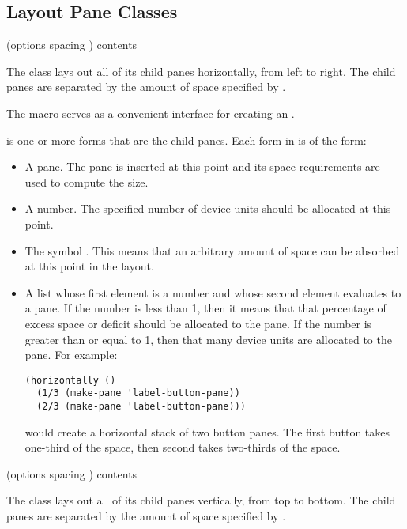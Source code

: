 \subsection {Layout Pane Classes}

 {(\rest options \key spacing \allow) \body contents}

The  class lays out all of its child panes horizontally, from left
to right.  The child panes are separated by the amount of space specified by
.

The  macro serves as a convenient interface for creating an
.

 is one or more forms that are the child panes.  Each form in
 is of the form:

\begin{itemize}
\item A pane.  The pane is inserted at this point and its space requirements are
used to compute the size.

\item A number.  The specified number of device units should be allocated at
this point.

\item The symbol .  This means that an arbitrary amount of space can
be absorbed at this point in the layout.

\item A list whose first element is a number and whose second element evaluates
to a pane.  If the number is less than 1, then it means that that percentage of
excess space or deficit should be allocated to the pane.  If the number is
greater than or equal to 1, then that many device units are allocated to the
pane.  For example:

\begin{verbatim}
(horizontally ()
  (1/3 (make-pane 'label-button-pane))
  (2/3 (make-pane 'label-button-pane)))
\end{verbatim}

would create a horizontal stack of two button panes.  The first button takes
one-third of the space, then second takes two-thirds of the space.
\end{itemize}


 {(\rest options \key spacing \allow) \body contents}

The  class lays out all of its child panes vertically, from top to
bottom.  The child panes are separated by the amount of space specified by
.


